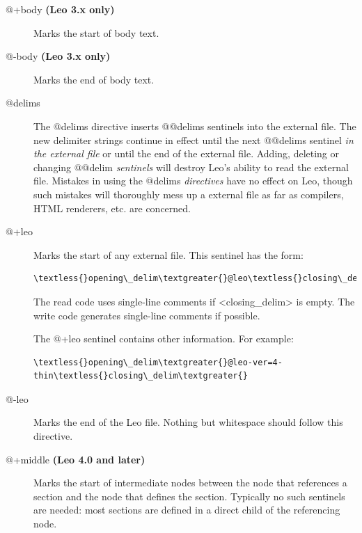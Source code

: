 \documentclass[a4paper,10pt,english]{sphinxmanual}
\begin{document}
\begin{description}
\item[{@+body \textbf{(Leo 3.x only)}}] \leavevmode
Marks the start of body text.

\item[{@-body \textbf{(Leo 3.x only)}}] \leavevmode
Marks the end of body text.

\item[{@delims}] \leavevmode
The @delims directive inserts @@delims sentinels into the external file.
The new delimiter strings continue in effect until the next @@delims sentinel
\emph{in the external file} or until the end of the external file.
Adding, deleting or changing @@delim \emph{sentinels} will destroy Leo's ability to read the external file.
Mistakes in using the @delims \emph{directives} have no effect on Leo,
though such mistakes will thoroughly mess up a external file as far as compilers,
HTML renderers, etc. are concerned.

\item[{@+leo}] \leavevmode
Marks the start of any external file. This sentinel has the form:

\begin{Verbatim}[commandchars=\\\{\}]
\textless{}opening\_delim\textgreater{}@leo\textless{}closing\_delim\textgreater{}
\end{Verbatim}

The read code uses single-line comments if \textless{}closing\_delim\textgreater{} is empty.
The write code generates single-line comments if possible.

The @+leo sentinel contains other information. For example:

\begin{Verbatim}[commandchars=\\\{\}]
\textless{}opening\_delim\textgreater{}@leo-ver=4-thin\textless{}closing\_delim\textgreater{}
\end{Verbatim}

\item[{@-leo}] \leavevmode
Marks the end of the Leo file.
Nothing but whitespace should follow this directive.

\item[{@+middle \textbf{(Leo 4.0 and later)}}] \leavevmode
Marks the start of intermediate nodes between the node that
references a section and the node that defines the section.
Typically no such sentinels are needed:
most sections are defined in a direct child of the referencing node.


\end{description}
\end{document}
